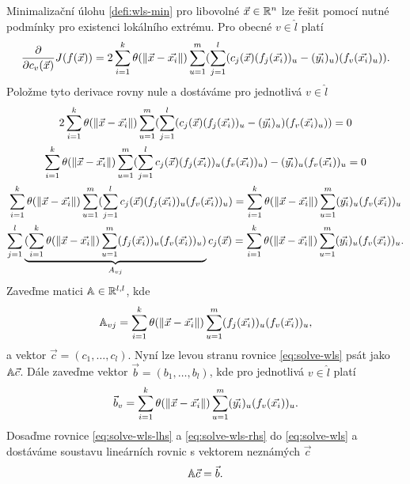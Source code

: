 Minimalizační úlohu \ref{defi:wls-min} pro libovolné $\vec{x} \in \mathbb{R}^n$ lze řešit pomocí nutné podmínky pro existenci lokálního extrému. Pro obecné $v \in \hat l$ platí
\begin{equation}
  \frac{\partial}{\partial c_v(\vec{x})}J(f(\vec{x})) = 2\sum_{i=1}^k\theta(\|\vec{x} - \vec{x_i}\|)\sum_{u=1}^m(\sum_{j=1}^l (c_j(\vec{x})(f_j(\vec{x_i}))_u - (\vec{y_i})_u)(f_v(\vec{x_i})_u)). 
\end{equation}
Položme tyto derivace rovny nule a dostáváme pro jednotlivá $v \in \hat l$
\begin{multline}
  \label{eq:solve-wls}
  2\sum_{i=1}^k \theta(\|\vec{x} - \vec{x_i}\|) \sum_{u=1}^m (\sum_{j=1}^l (c_j(\vec{x})(f_j(\vec{x_i}))_u - (\vec{y_i})_u)(f_v(\vec{x_i})_u)) = 0\\
  \sum_{i=1}^k \theta(\|\vec{x} - \vec{x_i}\|) \sum_{u=1}^m (\sum_{j=1}^l c_j(\vec{x})(f_j(\vec{x_i}))_u(f_v(\vec{x_i}))_u) - (\vec{y_i})_u(f_v(\vec{x_i}))_u = 0\\
  \sum_{i=1}^k \theta(\|\vec{x} - \vec{x_i}\|) \sum_{u=1}^m (\sum_{j=1}^l c_j(\vec{x})(f_j(\vec{x_i}))_u(f_v(\vec{x_i}))_u) = \sum_{i=1}^k \theta(\|\vec{x} - \vec{x_i}\|) \sum_{u=1}^m (\vec{y_i})_u(f_v(\vec{x_i}))_u\\
  \sum_{j=1}^l \underbrace{(\sum_{i=1}^k \theta(\|\vec{x} - \vec{x_i}\|) \sum_{u=1}^m (f_j(\vec{x_i}))_u(f_v(\vec{x_i}))_u)}_{A_{vj}}c_j(\vec{x}) = \sum_{i=1}^k \theta(\|\vec{x} - \vec{x_i}\|) \sum_{u=1}^m (\vec{y_i})_u(f_v(\vec{x_i}))_u.\\
\end{multline}
Zaveďme matici $\mathbb{A} \in \mathbb{R}^{l,l}$, kde
\begin{equation}
  \label{eq:solve-wls-lhs}
  \mathbb{A}_{vj} = \sum_{i=1}^k \theta(\|\vec{x} - \vec{x_i}\|) \sum_{u=1}^m (f_j(\vec{x_i}))_u(f_v(\vec{x_i}))_u,
\end{equation}
a vektor $\vec{c} = (c_1,\dots,c_l)$. Nyní lze levou stranu rovnice \ref{eq:solve-wls} psát jako $\mathbb{A}\vec{c}$. Dále zaveďme vektor $\vec{b} = (b_1,\ldots,b_l)$, kde pro jednotlivá $v \in \hat l$ platí
\begin{equation}
  \label{eq:solve-wls-rhs}
  \vec{b}_v = \sum_{i=1}^k \theta(\|\vec{x} - \vec{x_i}\|) \sum_{u=1}^m (\vec{y_i})_u(f_v(\vec{x_i}))_u.
\end{equation}
Dosaďme rovnice \ref{eq:solve-wls-lhs} a \ref{eq:solve-wls-rhs} do \ref{eq:solve-wls} a dostáváme soustavu lineárních rovnic s vektorem neznámých $\vec{c}$
\begin{equation}
  \mathbb{A}\vec{c} = \vec{b}.
\end{equation}

